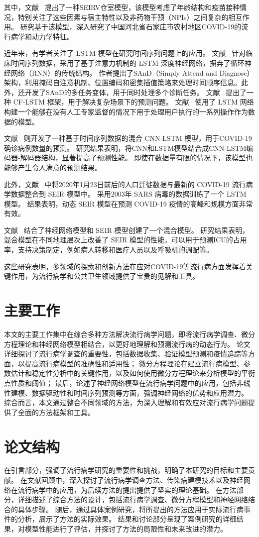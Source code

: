 其中，文献~\cite{Wei2023IDM} 提出了一种SEIRV仓室模型，该模型考虑了年龄结构和疫苗接种情况，特别关注了这些因素与宿主特性以及非药物干预（NPIs）之间复杂的相互作用。
研究基于该模型，深入研究了中国河北省石家庄市农村地区COVID-19的流行病学和动力学特征。

近年来，有学者关注了 LSTM 模型在研究时间序列问题上的应用。
文献~\cite{Huang2018AAAI} 针对临床时间序列数据，采用了基于注意力机制的 LSTM 深度神经网络，摒弃了循环神经网络（RNN）的传统结构。
作者提出了SAnD（Simply Attend and Diagnose）架构，利用掩码自注意机制、位置编码和密集插值策略来处理时间顺序信息。此外，还开发了SAnD的多任务变体，用于同时处理多个诊断任务。
文献~\cite{Xu2020AAAI} 提出了一种 CF-LSTM 框架，用于解决复杂场景下的预测问题。
文献~\cite{Xu2020AAAI} 使用了 LSTM 网络构建一个能够在没有人工专家监督的情况下用于处理用户执行的一系列操作作为数据的模型。

文献~\cite{Zain2021JCSE} 则开发了一种基于时间序列数据的混合 CNN-LSTM 模型，用于COVID-19确诊病例数量的预测。
研究结果表明，将CNN和LSTM模型结合成CNN-LSTM编码器-解码器结构，显著提高了预测性能。
即使在数据量有限的情况下，该模型也能够产生令人满意的预测结果。

此外，文献~\cite{Yang2020JTD} 中将2020年1月23日前后的人口迁徙数据与最新的 COVID-19 流行病学数据整合到 SEIR 模型中。
采用2003年 SARS 病毒的数据训练了一个 LSTM 模型。
结果表明，动态 SEIR 模型在预测 COVID-19 疫情的高峰和规模方面非常有效。

文献~\cite{Delli2022PLOSOne} 结合了神经网络模型和 SEIR 模型创建了一个混合模型。
研究结果表明，混合模型在不同地理层次上改善了 SEIR 模型的性能，可以用于预测ICU的占用率，支持决策制定，例如病人转移和医疗人员以及呼吸机的调配等。

这些研究表明，多领域的探索和创新方法在应对COVID-19等流行病方面发挥着关键作用，为流行病学和公共卫生领域提供了宝贵的见解和工具。


\section{主要工作}

本文的主要工作集中在综合多种方法解决流行病学问题，即将流行病学调查、微分方程理论和神经网络模型相结合，以更好地理解和预测流行病的动态行为。
论文详细探讨了流行病学调查的重要性，包括数据收集、验证模型预测和疫情追踪等方面，以提高流行病模型的准确性和适用性；
微分方程理论在建立流行病模型、参数估计和稳定性分析中的关键作用，以及如何使用微分方程理论来分析模型的平衡点性质和阈值；
最后，论述了神经网络模型在流行病学问题中的应用，包括非线性建模、数据驱动性和时间序列预测等方面，强调神经网络的优势和应用潜力。
综合而言，本文通过整合不同领域的方法，为深入理解和有效应对流行病学问题提供了全面的方法框架和工具。


\section{论文结构}

在引言部分，强调了流行病学研究的重要性和挑战，明确了本研究的目标和主要贡献。
在文献回顾中，深入探讨了流行病学调查方法、传染病建模技术以及神经网络在流行病学中的应用，为后续方法的提出提供了坚实的理论基础。
在方法部分，详细描述了综合方法的设计，包括流行病学调查、微分方程模型和神经网络结合的具体步骤。
随后，通过具体案例研究，将所提出的方法应用于实际流行病事件的分析，展示了方法的实际效果。
结果和讨论部分呈现了案例研究的详细结果，对模型性能进行了评估，并探讨了方法的局限性和未来改进的潜力。